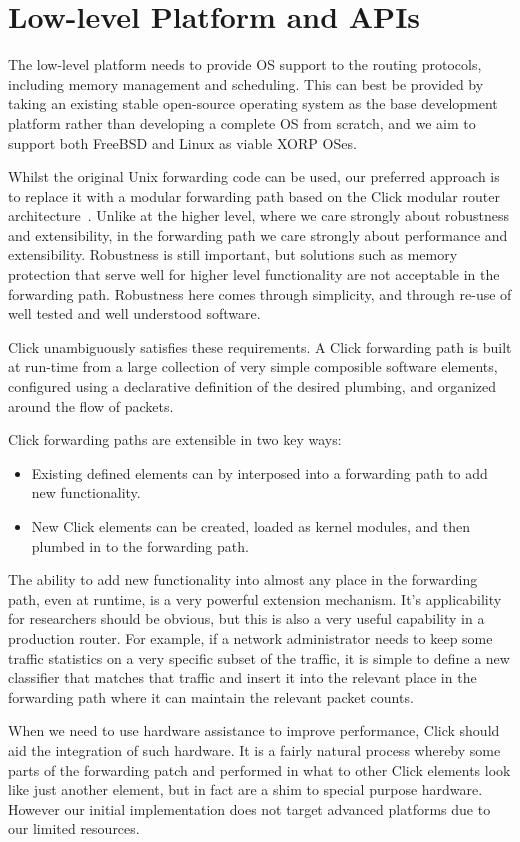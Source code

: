 
\section{Low-level Platform and APIs}
 
The low-level platform needs to provide OS support to the routing
protocols, including memory management and scheduling.  This can best
be provided by taking an existing stable open-source operating system
as the base development platform rather than developing a complete OS
from scratch, and we aim to support both FreeBSD and Linux as viable
XORP OSes.

Whilst the original Unix forwarding code can be used, our preferred
approach is to replace it with a modular forwarding path based on the
Click modular router architecture~\cite{click}.  Unlike at the higher
level, where we care strongly about robustness and extensibility, in
the forwarding path we care strongly about performance and
extensibility.  Robustness is still important, but solutions such as
memory protection that serve well for higher level functionality are
not acceptable in the forwarding path.  Robustness here comes through
simplicity, and through re-use of well tested and well understood
software.

Click unambiguously satisfies these requirements.  A Click forwarding path
is built at run-time from a large collection of very simple composible
software elements, configured using a declarative definition of the
desired plumbing, and organized around the flow of packets.

Click forwarding paths are extensible in two key ways:
\begin{itemize}
\item Existing defined elements can by interposed into a forwarding
path to add new functionality.
\item New Click elements can be created, loaded as kernel modules, and
then plumbed in to the forwarding path.
\end{itemize}
The ability to add new functionality into almost any place in the
forwarding path, even at runtime, is a very powerful extension
mechanism.  It's applicability for researchers should be obvious, but
this is also a very useful capability in a production router.  For
example, if a network administrator needs to keep some traffic
statistics on a very specific subset of the traffic, it is simple to
define a new classifier that matches that traffic and insert it into
the relevant place in the forwarding path where it can maintain the
relevant packet counts.

When we need to use hardware assistance to improve performance, Click
should aid the integration of such hardware.  It is a fairly natural
process whereby some parts of the forwarding patch and performed in
what to other Click elements look like just another element, but in
fact are a shim to special purpose hardware.  However our initial
implementation does not target advanced platforms due to our limited
resources.
